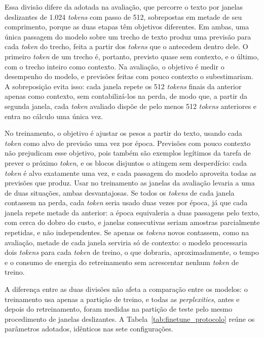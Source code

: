 Essa divisão difere da adotada na avaliação, que percorre o texto por janelas deslizantes
de 1.024 \textit{tokens} com passo de 512, sobrepostas em metade de seu comprimento,
porque as duas etapas têm objetivos diferentes.
Em ambas, uma única passagem do modelo sobre um trecho de texto produz uma previsão para
cada \textit{token} do trecho, feita a partir dos \textit{tokens} que o antecedem dentro
dele. O primeiro \textit{token} de um trecho é, portanto, previsto quase sem contexto, e
o último, com o trecho inteiro como contexto. Na avaliação, o objetivo é medir o
desempenho do modelo, e previsões feitas com pouco contexto o subestimariam. A
sobreposição evita isso: cada janela repete os 512 \textit{tokens} finais da anterior
apenas como contexto, sem contabilizá-los na perda, de modo que, a partir da segunda
janela, cada \textit{token} avaliado dispõe de pelo menos 512 \textit{tokens} anteriores
e entra no cálculo uma única vez.

No treinamento, o objetivo é ajustar os pesos a partir do texto, usando cada
\textit{token} como alvo de previsão uma vez por época. Previsões com pouco contexto não
prejudicam esse objetivo, pois também são exemplos legítimos da tarefa de prever o próximo
\textit{token}, e os blocos disjuntos o atingem sem desperdício: cada \textit{token} é alvo
exatamente uma vez, e cada passagem do modelo aproveita todas as previsões que produz.
Usar no treinamento as janelas da avaliação levaria a uma de duas situações, ambas
desvantajosas. Se todos os \textit{tokens} de cada janela contassem na perda, cada
\textit{token} seria usado duas vezes por época, já que cada janela repete metade da
anterior: a época equivaleria a duas passagens pelo texto, com cerca do dobro do custo, e janelas
consecutivas seriam amostras parcialmente repetidas, e não independentes. Se apenas os
\textit{tokens} novos contassem, como na avaliação, metade de cada janela serviria só de
contexto: o modelo processaria dois \textit{tokens} para cada \textit{token} de treino, o
que dobraria, aproximadamente, o tempo e o consumo de energia do retreinamento sem
acrescentar nenhum \textit{token} de treino.

A diferença entre as duas divisões não afeta a comparação entre os modelos: o
treinamento usa apenas a partição de treino, e todas as \textit{perplexities}, antes e
depois do retreinamento, foram medidas na partição de teste pelo mesmo procedimento de
janelas deslizantes. A Tabela~\ref{tab:finetune_protocolo} reúne os parâmetros adotados,
idênticos nas sete configurações.

